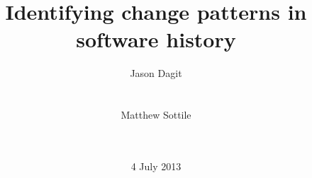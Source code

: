 \documentclass{acm_proc_article-sp}
\begin{document}
\title{Identifying change patterns in software history}

%
%
%
%
%

%
\author{
%
%
\alignauthor
Jason Dagit\\
       \\
       \\
\alignauthor
Matthew Sottile\\
       \\
       \\
}
\date{4 July 2013}
\end{document}
